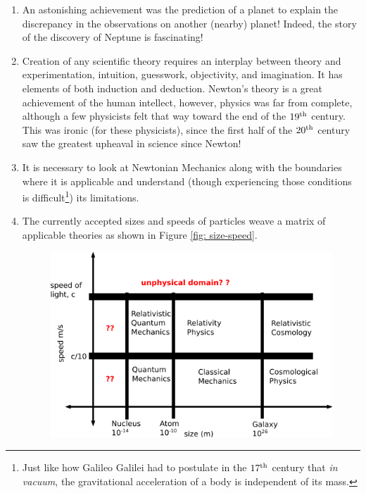 \documentclass[12pt,a4paper]{report}
\begin{document}
\begin{enumerate}
        \begin{enumerate}
            \item The bulging of earth and Jupiter because of their rotation.
            \item The variation of \emph{acceleration due to gravity} with the latitude\footnote{The small circle parallel to the great equatorial circle.}.
            \item The generation of tides on earth by the combined action of sun and moon.
            \item The paths of comets through the solar system.
            \item The slow but steady change in the direction of earth's axis.
        \end{enumerate}

    \item An astonishing achievement was the prediction of a planet to explain the discrepancy in the observations on another (nearby) planet! Indeed, the story of the discovery \cite{neptune} of Neptune is fascinating!
    \item Creation of any scientific theory requires an interplay between theory and experimentation, intuition, guesswork, objectivity, and imagination. It has elements of both induction and deduction. Newton's theory is a great achievement of the human intellect, however, physics was far from complete, although a few physicists felt that way toward the end of the $19\textsuperscript{th}$ century. This was ironic (for these physicists), since the first half of the $20\textsuperscript{th}$ century saw the greatest upheaval in science since Newton!
    \item It is necessary to look at Newtonian Mechanics along with the boundaries where it is applicable and understand (though experiencing those conditions is difficult\footnote{Just like how Galileo Galilei had to postulate in the $17\textsuperscript{th}$ century that \emph{in vacuum}, the gravitational acceleration of a body is independent of its mass.}) its limitations.
    \item The currently accepted sizes and speeds of particles weave a matrix of applicable theories as shown in Figure \ref{fig: size-speed}.
        \begin{figure}[h!]
            \centering
            \includegraphics[width=0.5\linewidth]{size-speed.png}

\end{figure}
\end{enumerate}
\end{document}
